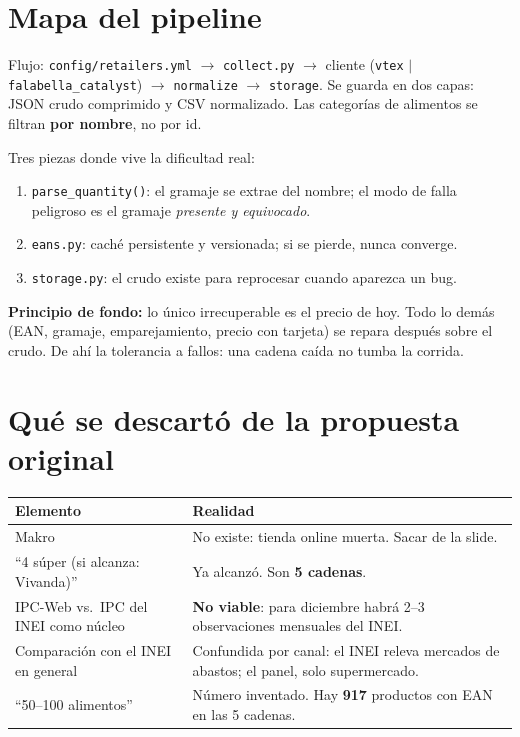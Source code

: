 \documentclass[11pt,a4paper]{article}
\begin{document}
\section{Mapa del pipeline}

Flujo: \texttt{config/retailers.yml} $\rightarrow$ \texttt{collect.py} $\rightarrow$
cliente (\texttt{vtex} $|$ \texttt{falabella\_catalyst}) $\rightarrow$
\texttt{normalize} $\rightarrow$ \texttt{storage}. Se guarda en dos capas: JSON crudo
comprimido y CSV normalizado. Las categorías de alimentos se filtran
\textbf{por nombre}, no por id.

Tres piezas donde vive la dificultad real:
\begin{enumerate}[nosep]
  \item \texttt{parse\_quantity()}: el gramaje se extrae del nombre; el modo de
        falla peligroso es el gramaje \emph{presente y equivocado}.
  \item \texttt{eans.py}: caché persistente y versionada; si se pierde, nunca converge.
  \item \texttt{storage.py}: el crudo existe para reprocesar cuando aparezca un bug.
\end{enumerate}

\textbf{Principio de fondo:} lo único irrecuperable es el precio de hoy. Todo lo
demás (EAN, gramaje, emparejamiento, precio con tarjeta) se repara después sobre
el crudo. De ahí la tolerancia a fallos: una cadena caída no tumba la corrida.

\section{Qué se descartó de la propuesta original}

\begin{table}[h]
\centering
\begin{tabular}{p{5cm}p{9.5cm}}
\toprule
\textbf{Elemento} & \textbf{Realidad} \\
\midrule
Makro & No existe: tienda online muerta. Sacar de la slide. \\
``4 súper (si alcanza: Vivanda)'' & Ya alcanzó. Son \textbf{5 cadenas}. \\
IPC-Web vs.\ IPC del INEI como núcleo & \textbf{No viable}: para diciembre habrá 2--3 observaciones mensuales del INEI. \\
Comparación con el INEI en general & Confundida por canal: el INEI releva mercados de abastos; el panel, solo supermercado. \\
``50--100 alimentos'' & Número inventado. Hay \textbf{917} productos con EAN en las 5 cadenas. \\
\bottomrule
\end{tabular}
\end{table}
\end{document}

